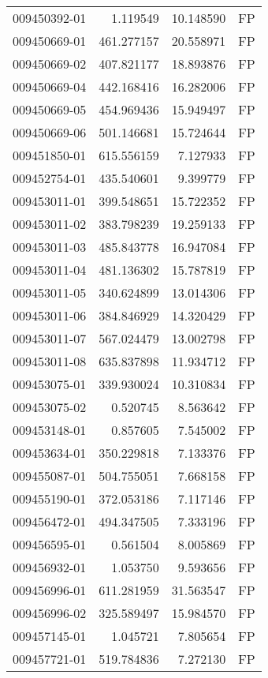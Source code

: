 \begin{tabular}{lrrl}
009450392-01 &    1.119549 &    10.148590 &   FP \\
009450669-01 &  461.277157 &    20.558971 &   FP \\
009450669-02 &  407.821177 &    18.893876 &   FP \\
009450669-04 &  442.168416 &    16.282006 &   FP \\
009450669-05 &  454.969436 &    15.949497 &   FP \\
009450669-06 &  501.146681 &    15.724644 &   FP \\
009451850-01 &  615.556159 &     7.127933 &   FP \\
009452754-01 &  435.540601 &     9.399779 &   FP \\
009453011-01 &  399.548651 &    15.722352 &   FP \\
009453011-02 &  383.798239 &    19.259133 &   FP \\
009453011-03 &  485.843778 &    16.947084 &   FP \\
009453011-04 &  481.136302 &    15.787819 &   FP \\
009453011-05 &  340.624899 &    13.014306 &   FP \\
009453011-06 &  384.846929 &    14.320429 &   FP \\
009453011-07 &  567.024479 &    13.002798 &   FP \\
009453011-08 &  635.837898 &    11.934712 &   FP \\
009453075-01 &  339.930024 &    10.310834 &   FP \\
009453075-02 &    0.520745 &     8.563642 &   FP \\
009453148-01 &    0.857605 &     7.545002 &   FP \\
009453634-01 &  350.229818 &     7.133376 &   FP \\
009455087-01 &  504.755051 &     7.668158 &   FP \\
009455190-01 &  372.053186 &     7.117146 &   FP \\
009456472-01 &  494.347505 &     7.333196 &   FP \\
009456595-01 &    0.561504 &     8.005869 &   FP \\
009456932-01 &    1.053750 &     9.593656 &   FP \\
009456996-01 &  611.281959 &    31.563547 &   FP \\
009456996-02 &  325.589497 &    15.984570 &   FP \\
009457145-01 &    1.045721 &     7.805654 &   FP \\
009457721-01 &  519.784836 &     7.272130 &   FP \\

\end{tabular}
